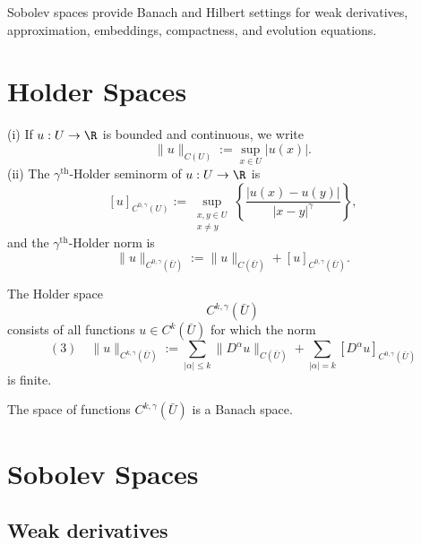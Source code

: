 
Sobolev spaces provide Banach and Hilbert settings for weak derivatives, approximation, embeddings, compactness, and evolution equations.

\section{Holder Spaces}
\label{sec:holder-spaces}

\begin{definition}
\label{def:holder-seminorm-sup-norm}
(i) If $u : U \to \R$ is bounded and continuous, we write
$$\|u\|_{C(U)} := \sup_{x \in U} |u(x)|.$$
(ii) The $\gamma^{\text{th}}$-Holder seminorm of $u : U \to \R$ is
$$[u]_{C^{0,\gamma}(U)} := \sup_{\substack{x,y \in U \\ x \ne y}} \left\{ \frac{|u(x) - u(y)|}{|x - y|^\gamma} \right\},$$
and the $\gamma^{\text{th}}$-Holder norm is
$$\|u\|_{C^{0,\gamma}(\bar U)} := \|u\|_{C(\bar U)} + [u]_{C^{0,\gamma}(\bar U)}.$$
\end{definition}

\begin{definition}
\label{def:holder-space}
The Holder space
$$C^{k,\gamma}(\bar U)$$
consists of all functions $u \in C^k(\bar U)$ for which the norm
$$(3) \quad \|u\|_{C^{k,\gamma}(\bar U)} := \sum_{|\alpha| \le k} \|D^\alpha u\|_{C(\bar U)} + \sum_{|\alpha| = k} [D^\alpha u]_{C^{0,\gamma}(\bar U)}$$
is finite.
\end{definition}

\begin{theorem}
\label{thm:holder-space-banach}
The space of functions $C^{k,\gamma}(\bar U)$ is a Banach space.
\end{theorem}

\section{Sobolev Spaces}
\label{sec:sobolev-spaces}

\subsection{Weak derivatives}


